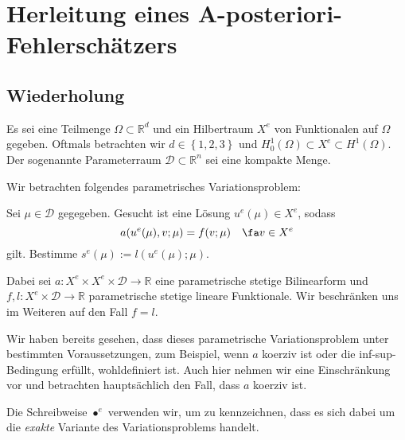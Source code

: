 
\section{Herleitung eines A-posteriori-Fehlerschätzers} %
\label{sec:herleitung}


\subsection{Wiederholung} %
\label{sub:wiederholung}

Es sei eine Teilmenge $\Omega \subset \mathbb{R}^d$ und ein Hilbertraum $X^e$ von Funktionalen auf $\Omega$ gegeben.
Oftmals betrachten wir $d \in \left\{ 1, 2, 3 \right\}$ und $H^1_0(\Omega) \subset X^e \subset H^1(\Omega)$.
Der sogenannte Parameterraum $\mathcal D \subset \mathbb{R}^n$ sei eine kompakte Menge.

Wir betrachten folgendes parametrisches Variationsproblem:
\begin{addmargin}[2em]{2em}
    Sei $\mu \in \mathcal D$ gegegeben. Gesucht ist eine Lösung $u^e(\mu) \in X^e$, sodass
    \begin{equation}
        a(u^e(\mu), v; \mu) = f(v; \mu) \quad \fa v \in X^e
    \end{equation}
    gilt.
    Bestimme $s^e(\mu) := l(u^e(\mu); \mu)$.
\end{addmargin}
Dabei sei $a \colon X^e \times X^e \times \mathcal D \to \mathbb{R}$ eine parametrische stetige Bilinearform und $f, l \colon X^e \times \mathcal D \to \mathbb{R}$ parametrische stetige lineare Funktionale.
Wir beschränken uns im Weiteren auf den Fall $f = l$.

Wir haben bereits gesehen, dass dieses parametrische Variationsproblem unter bestimmten Voraussetzungen, zum Beispiel, wenn $a$ koerziv ist oder die inf-sup-Bedingung erfüllt, wohldefiniert ist.
Auch hier nehmen wir eine Einschränkung vor und betrachten hauptsächlich den Fall, dass $a$ koerziv ist.

Die Schreibweise $\bullet^e$ verwenden wir, um zu kennzeichnen, dass es sich dabei um die \emph{exakte} Variante des Variationsproblems handelt.

